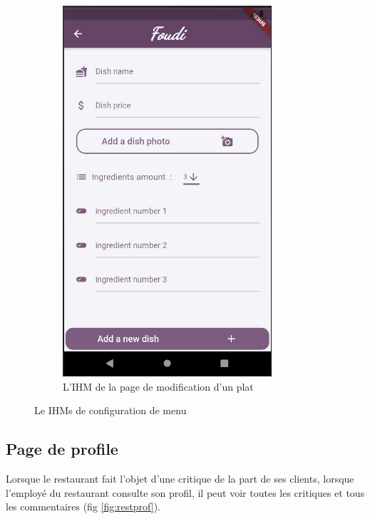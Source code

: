 \documentclass[french, a4paper, 12pt]{report}
\begin{document}
\begin{figure}[h!]
\begin{subfigure}{.5\textwidth}
  \centering
  \includegraphics[width=.9\linewidth]{screenshots/Restaurantviews/ModifyDish.png}
  \caption{L'IHM de la page de modification d'un plat}
  \label{fig:restedit}
\end{subfigure}
\caption{Le IHMs de configuration de menu}
\label{fig:restmnu}
\end{figure}
		
	\subsection{Page de profile} Lorsque le restaurant fait l'objet d'une critique de la part de ses clients, lorsque l'employé du restaurant consulte son profil, il peut voir toutes les critiques et tous les commentaires (fig \ref{fig:restprof}).
	
\end{document}
